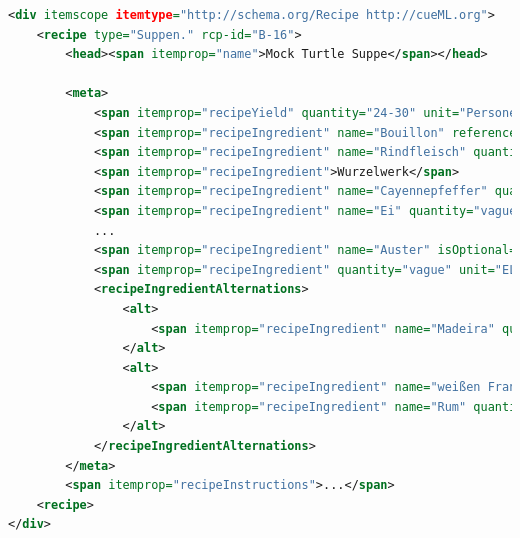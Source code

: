 \documentclass[12pt]{beamer}
\begin{document}
\begin{frame}[fragile]
\begin{lstlisting}[language=XML, caption={Rezept mit cueML}]
<div itemscope itemtype="http://schema.org/Recipe http://cueML.org">
	<recipe type="Suppen." rcp-id="B-16">
		<head><span itemprop="name">Mock Turtle Suppe</span></head>
		
		<meta>
			<span itemprop="recipeYield" quantity="24-30" unit="Personen">24-30 Personen</span>
			<span itemprop="recipeIngredient" name="Bouillon" reference="#Bouillon">Bouillon</span>
			<span itemprop="recipeIngredient" name="Rindfleisch" quantity="8-10" unit="Pfund">8-10 Pfund Rindfleisch</span>
			<span itemprop="recipeIngredient">Wurzelwerk</span>
			<span itemprop="recipeIngredient" name="Cayennepfeffer" quantity="vague" unit="Messersptize">ein Paar Messerspitzen Cayenne-Pfeffer</span>
			<span itemprop="recipeIngredient" name="Ei" quantity="vague">einige hart gekochte Eier</span>
			...
			<span itemprop="recipeIngredient" name="Auster" isOptional="True">Austern, wenn man sie haben kann</span>
			<span itemprop="recipeIngredient" quantity="vague" unit="EL" isOptional="True">ein Paar Eßlöffel Engl. Soja</span>
			<recipeIngredientAlternations>
				<alt>
					<span itemprop="recipeIngredient" name="Madeira" quantity="0.5" unit="Flasche">Madeira</span>
				</alt>
				<alt>
					<span itemprop="recipeIngredient" name="weißen Franzwein">weißen Franzwein</span>
					<span itemprop="recipeIngredient" name="Rum" quantity="vague">etwas Rum</span>
				</alt>
			</recipeIngredientAlternations>
		</meta>
		<span itemprop="recipeInstructions">...</span>
	<recipe>
</div>		
\end{lstlisting}
\end{frame}
\end{document}
